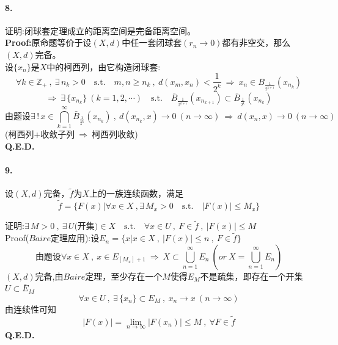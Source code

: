 \paragraph*{8.}证明:闭球套定理成立的距离空间是完备距离空间。\\
\textbf{Proof:}原命题等价于设$(X,d)$中任一套闭球套$(r_n \to 0)$都有非空交，那么$(X,d)$完备。\\
设$\{x_n\}$是$X$中的柯西列，由它构造闭球套:
\[\forall k \in \mathbb{Z}_+ \ , \ \exists \, n_k>0 \quad \text{s.t.} \quad m,n \geq n_k \ , \ d(x_m,x_n)<\frac{1}{2^k} \ \Rightarrow \ x_n \in B_{\frac{1}{2^{k+1}}}(x_{n_k})\]
\[\Rightarrow \ \exists \, \{x_{n_k}\} \ (k=1,2,\cdots) \quad \text{s.t.} \quad \bar{B}_{\frac{1}{2^{k+1}}}(x_{n_{k+1}}) \subset \bar{B}_{\frac{1}{2^k}}(x_{n_k})\]
\[\text{由题设} \exists \,! \, x \in \bigcap_{k=1}^{\infty}\bar{B}_{\frac{1}{2^k}}(x_{n_k}) \ , \ d(x_{n_k},x) \to 0 \ (n \to \infty) \ \Rightarrow \ d(x_n,x) \to 0 \ (n \to \infty)\]
(柯西列+收敛子列$\ \Rightarrow \ $柯西列收敛)\\
\textbf{Q.E.D.}

\paragraph*{9.}设$(X,d)$完备，$\tilde{f}$为$X$上的一族连续函数，满足
\[\tilde{f}=\{F(x)|\forall x \in X \ , \exists \, M_x>0 \quad \text{s.t.} \quad |F(x)| \leq M_x\}\]

证明:$\exists \, M>0 \ , \ \exists \, U\text{(开集)} \in X \quad \text{s.t.} \quad \forall x \in U \ , \ F \in \tilde{f} \ , \ |F(x)| \leq M$\\
Proof($Baire$定理应用):设$E_n=\{x|x \in X \ , \ |F(x)| \leq n \ , \ F \in \tilde{f}\}$
\[\text{由题设} \forall x \in X \ , \ x \in E_{[M_x]+1} \ \Rightarrow \ X \subset \bigcup_{n=1}^{\infty}E_n \ \left(or \ X=\bigcup_{n=1}^{\infty}E_n \right)\]
$(X,d)$完备,由$Baire$定理，至少存在一个$M$使得$E_M$不是疏集，即存在一个开集$U \subset \bar{E}_M$
\[\forall x \in U \ , \ \exists \, \{x_n\} \subset E_M \ , \ x_n \to x \ (n \to \infty)\]
由连续性可知
\[|F(x)|=\lim_{n \to \infty}|F(x_n)| \leq M \ , \ \forall F \in \tilde{f}\]
\textbf{Q.E.D.}

